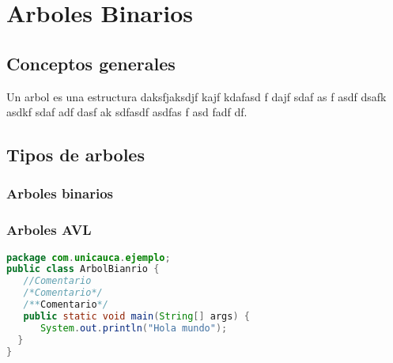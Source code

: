 \chapter{Arboles Binarios}

\section{Conceptos generales}
Un arbol es una estructura daksfjaksdjf kajf kdafasd
f dajf sdaf as
f asdf dsafk asdkf sdaf adf dasf  ak sdfasdf asdfas f
asd fadf 
df.


\section{Tipos de arboles}

\subsection{Arboles binarios}

\subsection{Arboles AVL}

\begin{lstlisting}[language=Java]
package com.unicauca.ejemplo;
public class ArbolBianrio {
   //Comentario
   /*Comentario*/
   /**Comentario*/
   public static void main(String[] args) {
      System.out.println("Hola mundo");
  }
}
\end{lstlisting}